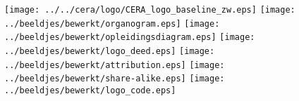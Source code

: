 \documentclass[british,english,dutch]{book}
\begin{document}
\texttt{[image: ../../cera/logo/CERA\_logo\_baseline\_zw.eps]}
\clearpage%
\texttt{[image: ../beeldjes/bewerkt/organogram.eps]}
\clearpage%
\texttt{[image: ../beeldjes/bewerkt/opleidingsdiagram.eps]}
\clearpage%
\texttt{[image: ../beeldjes/bewerkt/logo\_deed.eps]}
\clearpage%
\texttt{[image: ../beeldjes/bewerkt/attribution.eps]}
\clearpage%
\texttt{[image: ../beeldjes/bewerkt/share-alike.eps]}
\clearpage%
\texttt{[image: ../beeldjes/bewerkt/logo\_code.eps]}
\clearpage%
\end{document}

